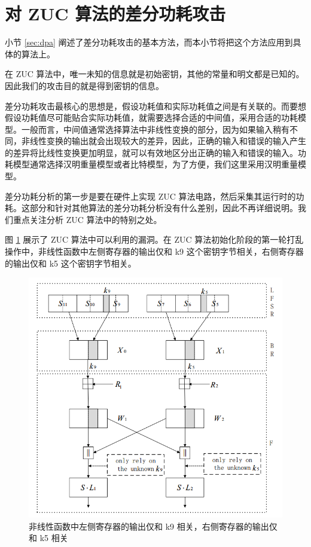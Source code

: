 \section{对 ZUC 算法的差分功耗攻击} %
\label{sec:zuc_attack}

小节 \ref{sec:dpa} 阐述了差分功耗攻击的基本方法，而本小节将把这个方法应用到具体的算法上。

在 ZUC 算法中，唯一未知的信息就是初始密钥，其他的常量和明文都是已知的。因此我们的攻击目的就是得到密钥的信息。

差分功耗攻击最核心的思想是，假设功耗值和实际功耗值之间是有关联的。而要想假设功耗值尽可能贴合实际功耗值，就需要选择合适的中间值，采用合适的功耗模型。一般而言，中间值通常选择算法中非线性变换的部分，因为如果输入稍有不同，非线性变换的输出就会出现较大的差异，因此，正确的输入和错误的输入产生的差异将比线性变换更加明显，就可以有效地区分出正确的输入和错误的输入。功耗模型通常选择汉明重量模型或者比特模型，为了方便，我们这里采用汉明重量模型。

\vspace*{\baselineskip}

差分功耗分析的第一步是要在硬件上实现 ZUC 算法电路，然后采集其运行时的功耗。这部分和针对其他算法的差分功耗分析没有什么差别，因此不再详细说明。我们重点关注分析 ZUC 算法中的特别之处。

\vspace*{\baselineskip}

图 \ref{fig:zuc_attack} 展示了 ZUC 算法中可以利用的漏洞。在 ZUC 算法初始化阶段的第一轮打乱操作中，非线性函数中左侧寄存器的输出仅和 k9 这个密钥字节相关，右侧寄存器的输出仅和 k5 这个密钥字节相关。

\begin{figure}[htbp]
    \centering
    \includegraphics[height=.5\textheight]{../images/zuc_attack.png}
    \caption{非线性函数中左侧寄存器的输出仅和 k9 相关，右侧寄存器的输出仅和 k5 相关}
    \label{fig:zuc_attack}

\end{figure}

